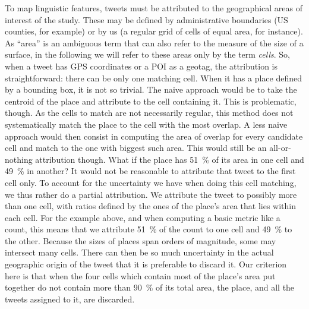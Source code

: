 \documentclass[../thesis.tex]{subfiles}
\begin{document}
To map linguistic features, tweets must be attributed to the geographical areas of
interest of the study. These may be defined by administrative boundaries (US counties,
for example) or by us (a regular grid of cells of equal area, for instance). As ``area''
is an ambiguous term that can also refer to the measure of the size of a surface, in the
following we will refer to these areas only by the term \emph{cells}. So, when a tweet
has GPS coordinates or a \ac{POI} as a geotag, the attribution is straightforward: there
can be only one matching cell. When it has a place defined by a bounding box, it is not
so trivial. The naive approach would be to take the centroid of the place and attribute
to the cell containing it. This is problematic, though. As the cells to match are not
necessarily regular, this method does not systematically match the place to the cell
with the most overlap. A less naive approach would then consist in computing the area of
overlap for every candidate cell and match to the one with biggest such area. This would
still be an all-or-nothing attribution though. What if the place has \SI{51}{\percent}
of its area in one cell and \SI{49}{\percent} in another? It would not be reasonable to
attribute that tweet to the first cell only. To account for the uncertainty we have when
doing this cell matching, we thus rather do a partial attribution. We attribute the
tweet to possibly more than one cell, with ratios defined by the ones of the place's
area that lies within each cell. For the example above, and when computing a basic
metric like a count, this means that we attribute \SI{51}{\percent} of the count to one
cell and \SI{49}{\percent} to the other. Because the sizes of places span orders of
magnitude, some may intersect many cells. There can then be so much uncertainty in the
actual geographic origin of the tweet that it is preferable to discard it. Our criterion
here is that when the four cells which contain most of the place's area put together do
not contain more than \SI{90}{\percent} of its total area, the place, and all the tweets
assigned to it, are discarded.
\end{document}
